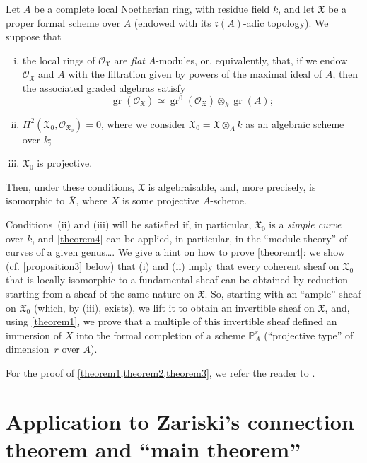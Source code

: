 \documentclass{article}
\theoremstyle{plain}
\newenvironment{theorem}[1]
  {\renewcommand\theinnercustomtheorem{#1}\innercustomtheorem}
  {\endinnercustomtheorem}
\theoremstyle{definition}
\newcommand{\sh}{\mathscr}
\newcommand{\fk}{\mathfrak}
\newcommand{\PP}{\mathbb{P}}
\DeclareMathOperator{\gr}{gr}
\newcommand{\oldpage}[1]{\marginpar{\footnotesize$\Big\vert$ \textit{p.~#1}}}
\begin{document}
\begin{theorem}{4}
\label{theorem4}
  Let $A$ be a complete local Noetherian ring, with residue field $k$, and let $\fk{X}$ be a proper formal scheme over $A$ (endowed with its $\mathfrak{r}(A)$-adic topology).
  We suppose that
  \begin{enumerate}[i.]
    \item the local rings of $\sh{O}_{\fk{X}}$ are \emph{flat} $A$-modules, or, equivalently, that, if we endow $\sh{O}_{\fk{X}}$ and $A$ with the filtration given by powers of the maximal ideal of $A$, then the associated graded algebras satisfy
      \[
        \gr(\sh{O}_{\fk{X}}) \simeq \gr^0(\sh{O}_{\fk{X}})\otimes_k\gr(A);
      \]
    \item $H^2(\fk{X}_0,\sh{O}_{\fk{X}_0})=0$, where we consider $\fk{X}_0=\fk{X}\otimes_Ak$ as an algebraic scheme over $k$;
\oldpage{182-07}
    \item $\fk{X}_0$ is projective.
  \end{enumerate}
  Then, under these conditions, $\fk{X}$ is algebraisable, and, more precisely, is isomorphic to $\overline{X}$, where $X$ is some projective $A$-scheme.
\end{theorem}

Conditions~(ii) and (iii) will be satisfied if, in particular, $\fk{X}_0$ is a \emph{simple curve} over $k$, and \cref{theorem4} can be applied, in particular, in the ``module theory'' of curves of a given genus\ldots.
We give a hint on how to prove \cref{theorem4}:
we show (cf. \cref{proposition3} below) that (i) and (ii) imply that every coherent sheaf on $\fk{X}_0$ that is locally isomorphic to a fundamental sheaf can be obtained by reduction starting from a sheaf of the same nature on $\fk{X}$.
So, starting with an ``ample'' sheaf on $\fk{X}_0$ (which, by (iii), exists), we lift it to obtain an invertible sheaf on $\fk{X}$, and, using \cref{theorem1}, we prove that a multiple of this invertible sheaf defined an immersion of $X$ into the formal completion of a scheme $\PP_A^r$ (``projective type'' of dimension~$r$ over $A$).

For the proof of \cref{theorem1,theorem2,theorem3}, we refer the reader to \cite{1}.


\section{Application to Zariski's connection theorem and ``main theorem''}
\label{section4}
\end{document}
